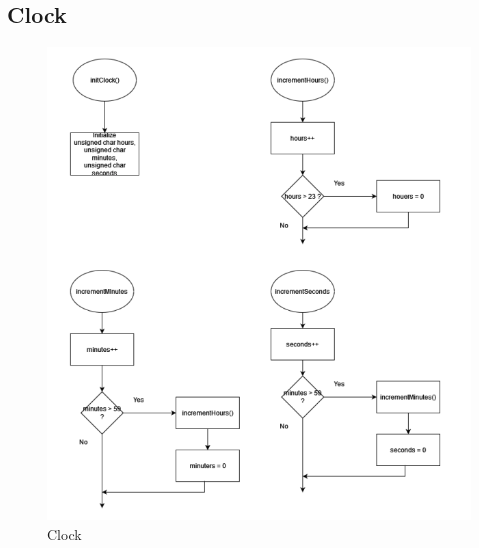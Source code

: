 \documentclass[a4paper,12pt]{article}
\begin{document}
\subsection{Clock}
\begin{figure}[H]
    \centering
    \includegraphics[width=1\textwidth]{diagrams/clock.png}
    \caption{Clock}
    \label{fig:Clock}
\end{figure}
\end{document}
